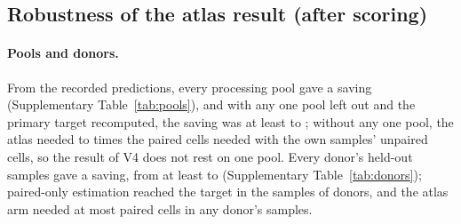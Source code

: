 \begin{table}[h]
\caption{\textbf{Other methods using the same paired draws and source atlas.} Validation test, pooled over the \VlNFolds{} held-out samples, five draws (last block: the first draw of every fold and budget). Champollion used 2,000 cells per assay and cell type from the atlas; the other methods used its full covariance summaries. Recovered: fraction of within-cell-type dependence recovered (\%). Paired cells: needed to reach the test's primary target (\VlTarget\%), with 95\% intervals from 2,000 resamples of donors; $>$800, not reached. Ratio: paired cells needed over those the estimator with the atlas needed (K1, SemiCCA; K2, reference regression; $\geq$, a lower bound). Readout, 100: direction (E1) and top 100 pairs (E2) with 100 paired cells. Ridge: reference regression with the Gram matrix of the paired contrasts or of the atlas. Forms: pooled over cell types; map, the pooled estimate mapped to each cell type through the atlas's condition maps; per cell type, refitted on each type's contrasts with the atlas's summaries of that type. Best form: the best at each budget, chosen on the held-out endpoint.}
\label{tab:alternatives}
\centering\footnotesize

\end{table}

\subsection*{Robustness of the atlas result (after scoring)}
\paragraph{Pools and donors.} From the recorded predictions, every processing pool gave a saving (Supplementary Table~\ref{tab:pools}), and with any one pool left out and the primary target recomputed, the saving was at least \RbLopoMin{} to \RbLopoMax; without any one pool, the atlas needed \RbLopoOwnMin{} to \RbLopoOwnMax{} times the paired cells needed with the own samples' unpaired cells, so the result of V4 does not rest on one pool. Every donor's held-out samples gave a saving, from at least \RbDonorMin{} to \RbDonorMax{} (Supplementary Table~\ref{tab:donors}); paired-only estimation reached the target in the samples of \RbDonorsPoReached{} donors, and the atlas arm needed at most \RbDonorAtlasMax{} paired cells in any donor's samples.

